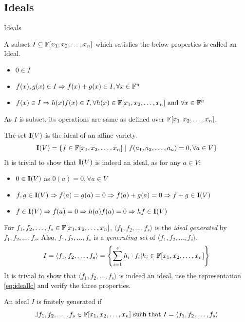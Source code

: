 \documentclass[aspectratio=169, handout, 10pt, hyperref=colorlinks]{beamer}
\begin{document}
\subsection{Ideals}
\begin{frame}[allowframebreaks]{Ideals}
    \begin{defn}[Ideal]
    A subset $I\subseteq \mathbb{F}[x_1, x_2, \ldots, x_n]$ which satisfies the below properties is called an Ideal.
    \begin{itemize}
        \item $0 \in I$
        \item $f(x),g(x) \in I \Rightarrow f(x)+g(x)\in I, \forall x \in \mathbb{F}^n$
        \item $f(x) \in I \Rightarrow h(x)f(x)\in I, \forall h(x)\in \mathbb{F}[x_1, x_2, \ldots, x_n] \text{ and }\forall x \in \mathbb{F}^n$
    \end{itemize}
    As $I$ is subset, its operations are same as defined over $\mathbb{F}[x_1, x_2, \ldots, x_n]$.
\end{defn}
\begin{defn}
    The set $\textbf{I}(V)$ is the ideal of an affine variety.
    \begin{equation}
        \textbf{I}(V) =\{f\in\mathbb{F}[x_1, x_2, \ldots, x_n] \ |\ f(a_1, a_2, \ldots, a_n)=0, \forall a\in V\}
    \end{equation}
    It is trivial to show that $\textbf{I}(V)$ is indeed an ideal, as for any $a\in V$:
    \begin{itemize}
        \item $0 \in \textbf{I}(V)$ as $0(a) = 0, \forall a \in V$
        \item $f,g \in \textbf{I}(V) \Rightarrow f(a) = g(a) = 0 \Rightarrow f(a)+g(a)=0 \Rightarrow f+g \in \textbf{I}(V)$
        \item $f \in \textbf{I}(V) \Rightarrow f(a) = 0 \Rightarrow h(a)f(a)=0 \Rightarrow hf \in \textbf{I}(V)$
    \end{itemize}
\end{defn}
\begin{lem}
    For $f_1,f_2,\ldots,f_s\in\mathbb{F}[x_1, x_2, \ldots, x_n]$,  $\langle f_1,f_2,\ldots,f_s\rangle$ is the \emph{ideal generated} by $f_1,f_2,\ldots,f_s$. Also, $f_1,f_2,\ldots,f_s$ is a \emph{generating set} of $\langle f_1,f_2,\ldots,f_s\rangle$.
    \begin{equation}{\label{eq:ideallc}}
        I = \langle f_1,f_2,\ldots,f_s\rangle = \left\{\sum_{i=1}^{s}h_{i}\cdot f_{i}|h_i \in \mathbb{F}[x_1, x_2, \ldots, x_n]\right\}
    \end{equation}
    It is trivial to show that $\langle f_1,f_2,\ldots,f_s\rangle$ is indeed an ideal, use the representation \ref{eq:ideallc} and verify the three properties.
\end{lem}
\begin{defn}
    An ideal $I$ is finitely generated if
    \begin{equation}
        \exists f_1,f_2,\ldots,f_s \in \mathbb{F}[x_1, x_2, \ldots, x_n] \text{ such that }I=\langle f_1,f_2,\ldots,f_s\rangle
    \end{equation}
\end{defn}
\end{frame}
\end{document}
